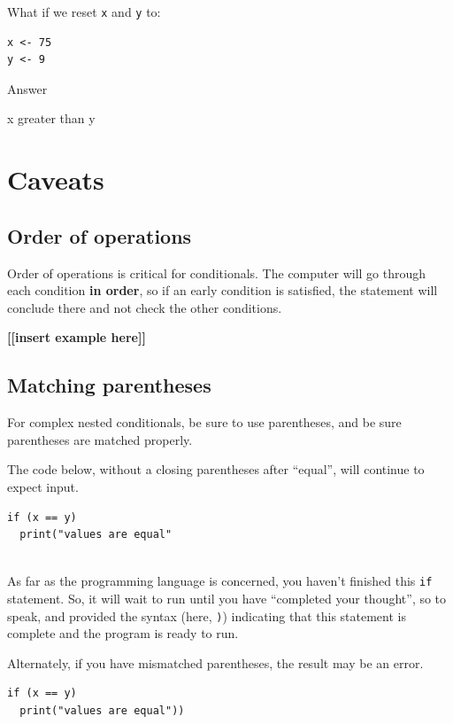 \documentclass[
]{book}
\begin{document}
\hfill\break

What if we reset \texttt{x} and \texttt{y} to:

\begin{verbatim}
x <- 75
y <- 9
\end{verbatim}

Answer

x greater than y

\hfill\break

\section{Caveats}\label{caveats-1}

\subsection{Order of operations}\label{order-of-operations}

Order of operations is critical for conditionals. The computer will go through each condition \textbf{in order}, so if an early condition is satisfied, the statement will conclude there and not check the other conditions.

\textbf{{[}{[}insert example here{]}{]}}

\subsection{Matching parentheses}\label{matching-parentheses}

For complex nested conditionals, be sure to use parentheses, and be sure parentheses are matched properly.

The code below, without a closing parentheses after ``equal'', will continue to expect input.

\begin{verbatim}
if (x == y) 
  print("values are equal"
  
\end{verbatim}

As far as the programming language is concerned, you haven't finished this \texttt{if} statement. So, it will wait to run until you have ``completed your thought'', so to speak, and provided the syntax (here, \texttt{)}) indicating that this statement is complete and the program is ready to run.

Alternately, if you have mismatched parentheses, the result may be an error.

\begin{verbatim}
if (x == y) 
  print("values are equal"))
  
\end{verbatim}
\end{document}
